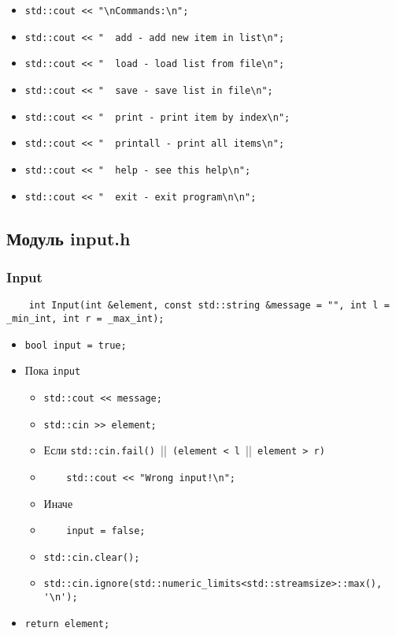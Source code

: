 \begin{itemize}
	\item \verb|std::cout << "\nCommands:\n";|
    \item \verb|std::cout << "  add - add new item in list\n";|
    \item \verb|std::cout << "  load - load list from file\n";|
    \item \verb|std::cout << "  save - save list in file\n";|
    \item \verb|std::cout << "  print - print item by index\n";|
    \item \verb|std::cout << "  printall - print all items\n";|
    \item \verb|std::cout << "  help - see this help\n";|
    \item \verb|std::cout << "  exit - exit program\n\n";|
\end{itemize}


\subsection*{Модуль input.h}


\subsubsection*{Input}

\begin{lstlisting}
	int Input(int &element, const std::string &message = "", int l = _min_int, int r = _max_int);
\end{lstlisting}

\begin{itemize}
	\item \verb|bool input = true;|
	\item Пока \verb|input|
		\begin{itemize}
			\item \verb|std::cout << message;|
			\item \verb|std::cin >> element;|
			\item Если \verb|std::cin.fail() |||\verb| (element < l |||\verb| element > r)|
			\item \verb|    std::cout << "Wrong input!\n";|
			\item Иначе
			\item \verb|    input = false;|
			\item \verb|std::cin.clear();|
			\item \verb|std::cin.ignore(std::numeric_limits<std::streamsize>::max(), '\n');|
		\end{itemize}
    \item \verb|return element;|
\end{itemize}


